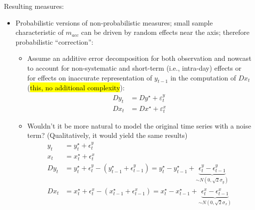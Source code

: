 \documentclass[oneside]{article}
\theoremstyle{plain}%
\theoremstyle{definition}
\newcommand{\ind}[1]{\mathbbm{1}\{#1\}}
\newcommand{\ydiff}{D y}
\newcommand{\ydifft}{Dy^\star}
\newcommand{\xdiff}{Dx}
\newcommand{\xdifft}{Dx^\star}
\begin{document}
Resulting measures:
\begin{itemize}

\item Probabilistic versions of non-probabilistic measures; small sample characteristic of $m_{acc}$ can be driven by random effects near the axis; therefore probabilistic \enquote{correction}:
\begin{itemize}
  \item Assume an additive error decomposition for both observation and nowcast to account for non-systematic and short-term (i.e., intra-day) effects or for effects on inaccurate representation of $y_{t-1}$ in the computation of $Dx_t$ (\hl{this, no additional complexity}):
  	\begin{align}\label{additive error decomposition}
  		\ydiff_t &= \ydifft + \varepsilon_t^y \\
  		\xdiff_t &= \xdifft + \varepsilon_t^x
	\end{align}
 \item Wouldn't it be more natural to model the original time series with a noise term? (Qualitatively, it would yield the same results)
 \begin{align}
     y_t &= y_t^\star + \epsilon_t^y \\
     x_t &= x_t^\star + \epsilon_t^x \\
     \ydiff_t &= y_t^\star + \epsilon_t^y - (y_{t-1}^\star + \epsilon_{t-1}^y) = y_t^\star - y_{t-1}^\star + \underbrace{\epsilon_t^y - \epsilon_{t-1}^y}_{\sim N(0, \sqrt{2} \sigma_y)} \\
     \xdiff_t &= x_t^\star + \epsilon_t^x - (x_{t-1}^\star + \epsilon_{t-1}^x) = x_t^\star - x_{t-1}^\star + \underbrace{\epsilon_t^x - \epsilon_{t-1}^x}_{\sim N(0, \sqrt{2} \sigma_x)}

\end{align}
\end{itemize}
\end{itemize}
\end{document}
